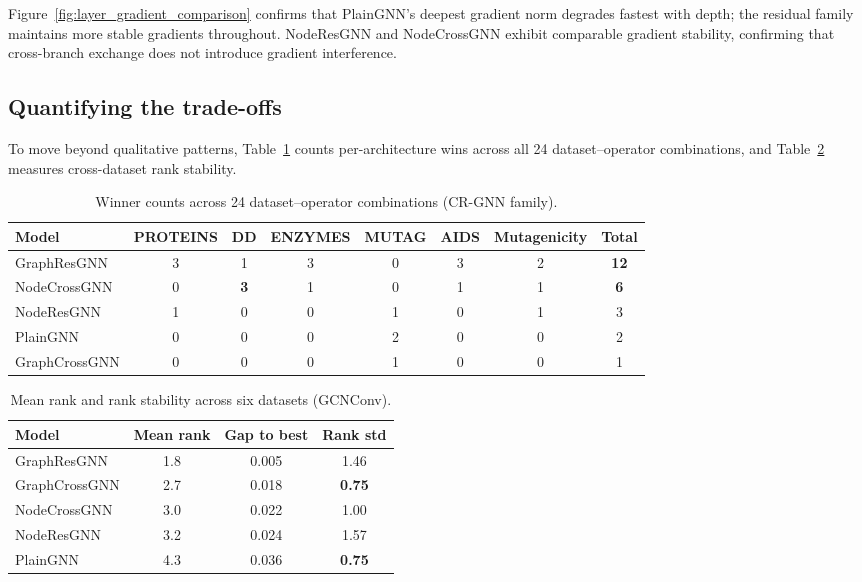 Figure~\ref{fig:layer_gradient_comparison} confirms that PlainGNN's deepest gradient norm degrades fastest with depth; the residual family maintains more stable gradients throughout. NodeResGNN and NodeCrossGNN exhibit comparable gradient stability, confirming that cross-branch exchange does not introduce gradient interference.

\subsection{Quantifying the trade-offs}

To move beyond qualitative patterns, Table~\ref{tab:winner_summary} counts per-architecture wins across all 24 dataset--operator combinations, and Table~\ref{tab:consistency} measures cross-dataset rank stability.

\begin{table}[h]
\centering
\small
\caption{Winner counts across 24 dataset--operator combinations (CR-GNN family).}
\label{tab:winner_summary}
\begin{tabular}{l c c c c c c c}
\toprule
Model & PROTEINS & DD & ENZYMES & MUTAG & AIDS & Mutagenicity & Total \\
\midrule
GraphResGNN & 3 & 1 & 3 & 0 & 3 & 2 & \textbf{12} \\
NodeCrossGNN & 0 & \textbf{3} & 1 & 0 & 1 & 1 & \textbf{6} \\
NodeResGNN & 1 & 0 & 0 & 1 & 0 & 1 & 3 \\
PlainGNN & 0 & 0 & 0 & 2 & 0 & 0 & 2 \\
GraphCrossGNN & 0 & 0 & 0 & 1 & 0 & 0 & 1 \\
\bottomrule
\end{tabular}
\end{table}

\begin{table}[h]
\centering
\small
\caption{Mean rank and rank stability across six datasets (GCNConv).}
\label{tab:consistency}
\begin{tabular}{l c c c}
\toprule
Model & Mean rank & Gap to best & Rank std \\
\midrule
GraphResGNN & 1.8 & 0.005 & 1.46 \\
GraphCrossGNN & 2.7 & 0.018 & \textbf{0.75} \\
NodeCrossGNN & 3.0 & 0.022 & 1.00 \\
NodeResGNN & 3.2 & 0.024 & 1.57 \\
PlainGNN & 4.3 & 0.036 & \textbf{0.75} \\
\bottomrule
\end{tabular}
\end{table}

